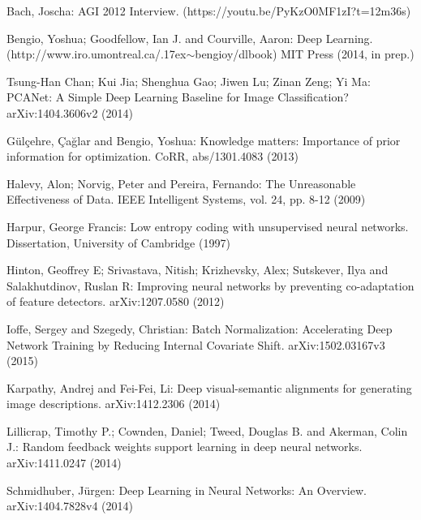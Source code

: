 \documentclass[citeauthoryear]{llncs}
\begin{document}
%
%
\begin{thebibliography}{}
%
\newcommand{\mytilde}{\raise.17ex\hbox{$\scriptstyle\mathtt{\sim}$}}

Bach, Joscha:
AGI 2012 Interview.
(https://youtu.be/PyKzO0MF1zI?t=12m36s)

Bengio, Yoshua; Goodfellow, Ian J. and Courville, Aaron:
Deep Learning.
(http://www.iro.umontreal.ca/\mytilde{}bengioy/dlbook)
MIT Press (2014, in prep.)

Tsung-Han Chan; Kui Jia; Shenghua Gao; Jiwen Lu; Zinan Zeng; Yi Ma:
PCANet: A Simple Deep Learning Baseline for Image Classification?
arXiv:1404.3606v2 (2014)

G{\"u}l{\c{c}}ehre, {\c{C}}a{\u{g}}lar and Bengio, Yoshua:
Knowledge matters: Importance of prior information for optimization.
CoRR, abs/1301.4083 (2013)

Halevy, Alon; Norvig, Peter and Pereira, Fernando:
The Unreasonable Effectiveness of Data.
IEEE Intelligent Systems, vol. 24, pp. 8-12 (2009)

Harpur, George Francis: 
Low entropy coding with unsupervised neural networks.
Dissertation, University of Cambridge (1997)

Hinton, Geoffrey E; Srivastava, Nitish; Krizhevsky, Alex; Sutskever, Ilya and Salakhutdinov, Ruslan R:
Improving neural networks by preventing co-adaptation of feature detectors.
arXiv:1207.0580 (2012)

Ioffe, Sergey and Szegedy, Christian:
Batch Normalization: Accelerating Deep Network Training by Reducing Internal Covariate Shift.
arXiv:1502.03167v3 (2015)

Karpathy, Andrej and Fei-Fei, Li:
Deep visual-semantic alignments for generating image descriptions.
arXiv:1412.2306 (2014)

Lillicrap, Timothy P.; Cownden, Daniel; Tweed, Douglas B. and Akerman, Colin J.:
Random feedback weights support learning in deep neural networks.
arXiv:1411.0247 (2014)

Schmidhuber, J{\"u}rgen:
Deep Learning in Neural Networks: An Overview.
arXiv:1404.7828v4 (2014)


\end{thebibliography}
\end{document}
